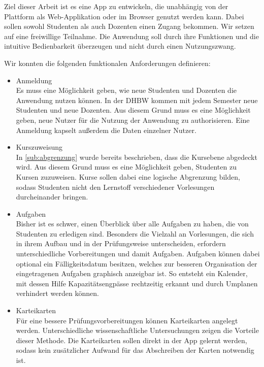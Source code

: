 Ziel dieser Arbeit ist es eine App zu entwickeln, die unabhängig von der Plattform als Web-Applikation oder im Browser genutzt werden kann.
Dabei sollen sowohl Studenten als auch Dozenten einen Zugang bekommen.
Wir setzen auf eine freiwillige Teilnahme. Die Anwendung soll durch ihre Funktionen und die intuitive Bedienbarkeit überzeugen und nicht durch einen Nutzungszwang.

Wir konnten die folgenden funktionalen Anforderungen definieren:
\begin{itemize}
    \item Anmeldung                         \\
        Es muss eine Möglichkeit geben, wie neue Studenten und Dozenten die Anwendung nutzen können.
        In der DHBW kommen mit jedem Semester neue Studenten und neue Dozenten.
        Aus diesem Grund muss es eine Möglichkeit geben, neue Nutzer für die Nutzung der Anwendung zu authorisieren.
        Eine Anmeldung kapselt außerdem die Daten einzelner Nutzer.
    \item Kurszuweisung                     \\
        In \autoref{sub:abgrenzung} wurde bereits beschrieben, dass die Kursebene abgedeckt wird.
        Aus diesem Grund muss es eine Möglichkeit geben, Studenten zu Kursen zuzuweisen.
        Kurse sollen dabei eine logische Abgrenzung bilden, sodass Studenten nicht den Lernstoff  verschiedener Vorlesungen durcheinander bringen.
    \item Aufgaben                             \\
        Bisher ist es schwer, einen Überblick über alle Aufgaben zu haben, die von Studenten zu erledigen sind.
        Besonders die Vielzahl an Vorlesungen, die sich in ihrem Aufbau und in der Prüfungsweise unterscheiden, erfordern unterschiedliche Vorbereitungen und damit Aufgaben.
        Aufgaben können dabei optional ein Fälligkeitsdatum besitzen, welches zur besseren Organisation der eingetragenen Aufgaben graphisch anzeigbar ist.
        So entsteht ein Kalender, mit dessen Hilfe  Kapazitätsengpässe rechtzeitig erkannt und durch Umplanen verhindert werden können.
    \item Karteikarten                      \\
        Für eine bessere Prüfungsvorbereitungen können Karteikarten angelegt werden. Unterschiedliche wissenschaftliche Untersuchungen zeigen die Vorteile dieser Methode. Die Karteikarten sollen direkt in der App gelernt werden, sodass kein zusätzlicher Aufwand für das Abschreiben der Karten notwendig ist.


\end{itemize}
